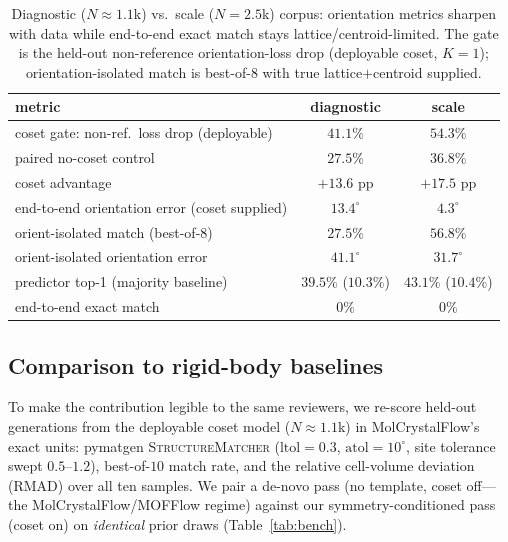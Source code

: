 \documentclass[journal=jcisd8,manuscript=article]{achemso}
\begin{document}
\begin{table}[t]\centering
\caption{Diagnostic ($N\!\approx\!1.1$k) vs.\ scale ($N\!=\!2.5$k) corpus:
orientation metrics sharpen with data while end-to-end exact match stays
lattice/centroid-limited. The gate is the held-out non-reference orientation-loss
drop (deployable coset, $K{=}1$); orientation-isolated match is best-of-$8$ with
true lattice$+$centroid supplied.}
\label{tab:scale}
\begin{tabular}{lcc}\toprule
metric & diagnostic & scale \\\midrule
coset gate: non-ref.\ loss drop (deployable) & $41.1\%$ & $\mathbf{54.3\%}$ \\
\quad paired no-coset control                & $27.5\%$ & $36.8\%$ \\
\quad coset advantage                        & $+13.6$ pp & $\mathbf{+17.5}$ pp \\
end-to-end orientation error (coset supplied)& $13.4^\circ$ & $\mathbf{4.3^\circ}$ \\
orient-isolated match (best-of-$8$)          & $27.5\%$ & $\mathbf{56.8\%}$ \\
orient-isolated orientation error            & $41.1^\circ$ & $\mathbf{31.7^\circ}$ \\
predictor top-1 (majority baseline)          & $39.5\%$ ($10.3\%$) & $43.1\%$ ($10.4\%$) \\
end-to-end exact match                       & $0\%$ & $0\%$ \\\bottomrule
\end{tabular}
\end{table}

\subsection{Comparison to rigid-body baselines}\label{sec:bench}
To make the contribution legible to the same reviewers, we re-score held-out
generations from the deployable coset model ($N\!\approx\!1.1$k) in
MolCrystalFlow's exact units\cite{zeng2026molcrystalflow}: pymatgen
\textsc{StructureMatcher} ($\text{ltol}{=}0.3$, $\text{atol}{=}10^\circ$, site
tolerance swept $0.5$--$1.2$), best-of-$10$ match rate, and the relative
cell-volume deviation (RMAD) over all ten samples. We pair a de-novo pass (no
template, coset off---the MolCrystalFlow/MOFFlow regime) against our
symmetry-conditioned pass (coset on) on \emph{identical} prior draws
(Table~\ref{tab:bench}).
\end{document}
